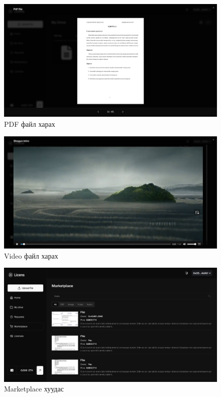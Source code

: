 \begin{figure}[h!]
	\centering
	\includegraphics[scale=0.16]{src/images/pdf-viewer.png}
	\caption{PDF файл харах}
\end{figure}

\begin{figure}[h!]
	\centering
	\includegraphics[scale=0.16]{src/images/video-viewer.png}
	\caption{Video файл харах}
\end{figure}

\begin{figure}[h!]
	\centering
	\includegraphics[scale=0.16]{src/images/marketplace.png}
	\caption{Marketplace хуудас}
\end{figure}

